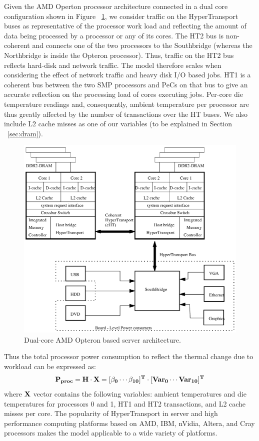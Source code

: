 \documentclass[12pt,onecolumn]{ULieeetran}
\begin{document}
Given the AMD Operton processor architecture connected in a dual core
configuration shown in Figure ~\ref{fig:optarch}, we consider 
traffic on the HyperTransport buses as representative of the processor work load
and reflecting the amount of data being processed by a
processor or any of its cores.  The HT2 bus is non-coherent and
connects one of the two processors to the Southbridge (whereas the Northbridge
is inside the Opteron processor). Thus, traffic on the HT2 bus reflects
hard-disk and network traffic. The model therefore scales when considering
the effect of network traffic and heavy disk I/O based jobs. HT1 is a
coherent bus between the two SMP processors and PeCs on that bus to
give an accurate reflection on the processing load of cores executing
jobs. Per-core die temperature readings and, consequently, ambient
temperature per processor are thus greatly affected by the number of
transactions over the HT buses. We also include L2 cache misses as one
of our variables (to be explained in Section ~\ref{sec:dram}).
\begin{figure}[htbp]
	\begin{center}
		\includegraphics[scale=0.4]{x2200sys.pdf}
		\caption{Dual-core AMD Opteron based server architecture.}
		\label{fig:optarch}
	\end{center}
\end{figure}

Thus the total processor power consumption to reflect the thermal change due
to workload can be expressed as:
\begin{equation*}
\label{eqn:procpwr}
\bf{P_{proc}} =  \bf{H} \cdot \bf{X} 
 = [ \beta_0 \cdots \beta_{10} ]^T \cdot [ Var_0 \cdots Var_{10} ]^T
\end{equation*}
where $\bf{X}$ vector contains the following variables: ambient temperatures and
die temperatures for processors 0 and 1, HT1 and HT2 transactions, and
L2 cache misses per core.  The popularity of HyperTransport in server
and high performance computing platforms based on AMD, IBM, nVidia, Altera,
and Cray processors makes the model applicable to a wide
variety of platforms.
\end{document}
